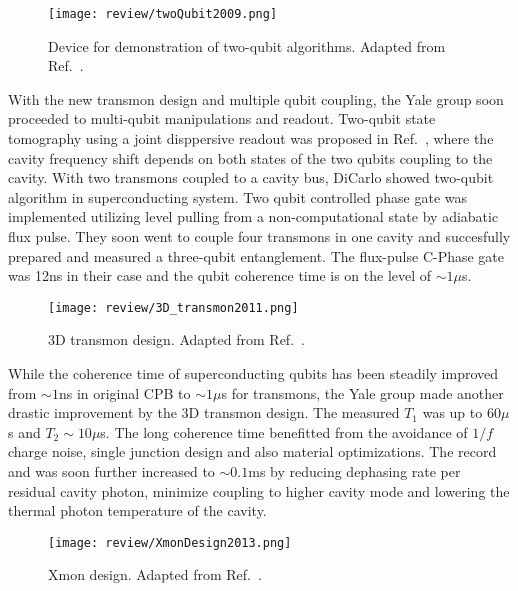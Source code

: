             \begin{figure}[h]
                \centering
                \texttt{[image: review/twoQubit2009.png]}
                \caption{Device for demonstration of two-qubit algorithms. Adapted from Ref.~.}
                \label{fig:twoQubit2009}
            \end{figure}

With the new transmon design and multiple qubit coupling, the Yale group soon proceeded to multi-qubit manipulations and readout. Two-qubit state tomography using a joint disppersive readout was proposed in Ref.~, where the cavity frequency shift depends on both states of the two qubits coupling to the cavity. With two transmons coupled to a cavity bus, DiCarlo \etal{} showed two-qubit algorithm in superconducting system\cite{DiCarlo2009}. Two qubit controlled phase gate was implemented utilizing level pulling from a non-computational state by adiabatic flux pulse. They soon went to couple four transmons in one cavity and succesfully prepared and measured a three-qubit entanglement\cite{DiCarlo2010}. The flux-pulse C-Phase gate was 12ns in their case and the qubit coherence time is on the level of $\sim 1 \mu$s.


            \begin{figure}[h]
                \centering
                \texttt{[image: review/3D\_transmon2011.png]}
                \caption{3D transmon design. Adapted from Ref.~.}
                \label{fig:Paik2011}
            \end{figure}

While the coherence time of superconducting qubits has been steadily improved from $\sim 1$ns in original CPB to $\sim 1 \mu$s for transmons, the Yale group made another drastic improvement by the 3D transmon design\cite{Paik2011}. The measured $T_1$ was up to $60\mu$s and $T_2 \sim 10\mu$s. The long coherence time benefitted from the avoidance of $1/f$ charge noise, single junction design and also material optimizations. The record and was soon further increased to $\sim 0.1$ms\cite{Rigetti2012} by reducing dephasing rate per residual cavity photon, minimize coupling to higher cavity mode and lowering the thermal photon temperature of the cavity.



            \begin{figure}[h]
                \centering
                \texttt{[image: review/XmonDesign2013.png]}
                \caption{Xmon design. Adapted from Ref.~.}
                \label{fig:XmonDesign2013}
            \end{figure}




